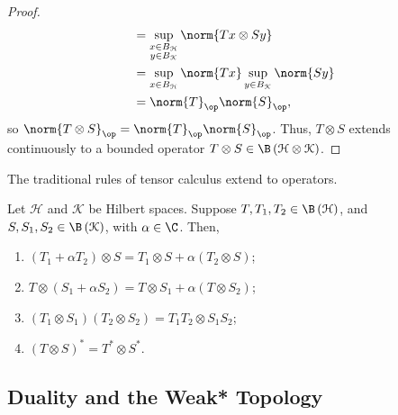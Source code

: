 \documentclass[10pt]{mypackage}
\begin{document}
\begin{proof}
\begin{align*}
                            &= \sup_{\substack{x\in B_{\mathcal{H}}\\y\in B_{\mathcal{K}}}}\norm{Tx\otimes Sy}\\
                            &= \sup_{x\in B_{\mathcal{H}}}\norm{Tx}\sup_{y\in B_{\mathcal{K}}}\norm{Sy}\\
                            &= \norm{T}_{\op}\norm{S}_{\op},
  \end{align*}
  so $\norm{T\otimes S}_{\op} = \norm{T}_{\op}\norm{S}_{\op}$. Thus, $T\otimes S$ extends continuously to a bounded operator $T\otimes S\in \B\left( \mathcal{H}\otimes \mathcal{K} \right)$.
\end{proof}
The traditional rules of tensor calculus extend to operators.
\begin{lemma}
  Let $\mathcal{H}$ and $\mathcal{K}$ be Hilbert spaces. Suppose $T,T_1,T_2\in\B\left( \mathcal{H} \right)$, and $S,S_1,S_2\in \B\left( \mathcal{K} \right)$, with $\alpha \in \C$. Then,
  \begin{enumerate}[(1)]
    \item $\left( T_1 + \alpha T_2 \right)\otimes S = T_1\otimes S + \alpha \left( T_2\otimes S \right)$;
    \item $T\otimes \left( S_1 + \alpha S_2 \right) = T\otimes S_1 + \alpha\left( T\otimes S_2 \right)$;
    \item $\left( T_1\otimes S_1 \right)\left( T_2\otimes S_2 \right) = T_1T_2\otimes S_1S_2$;
    \item $\left( T\otimes S \right)^{\ast} = T^{\ast}\otimes S^{\ast}$.
  \end{enumerate}
\end{lemma}

\subsection{Duality and the Weak* Topology}%
\end{document}
